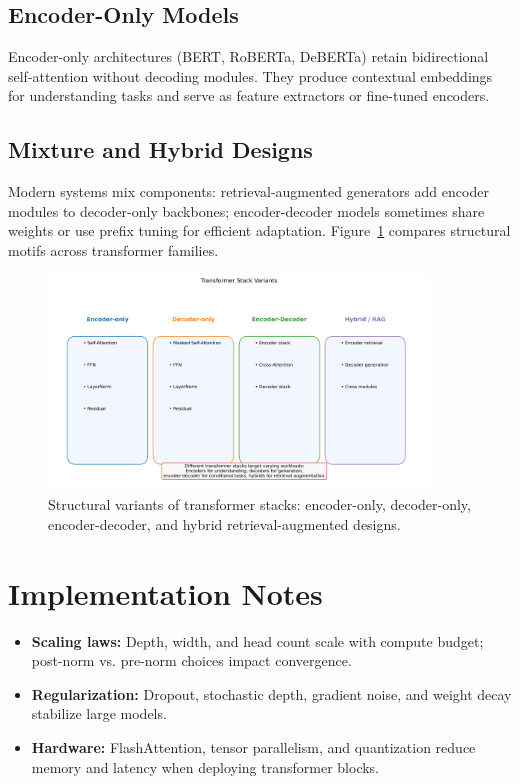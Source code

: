 \documentclass{article}
\begin{document}
\subsection{Encoder-Only Models}
Encoder-only architectures (BERT, RoBERTa, DeBERTa) retain bidirectional self-attention without decoding modules. They produce contextual embeddings for understanding tasks and serve as feature extractors or fine-tuned encoders.

\subsection{Mixture and Hybrid Designs}
Modern systems mix components: retrieval-augmented generators add encoder modules to decoder-only backbones; encoder-decoder models sometimes share weights or use prefix tuning for efficient adaptation. Figure~\ref{fig:transformer_stack_variants} compares structural motifs across transformer families.

\begin{figure}[H]
  \centering
  \includegraphics[width=0.9\textwidth]{transformer_stack_variants.png}
  \caption{Structural variants of transformer stacks: encoder-only, decoder-only, encoder-decoder, and hybrid retrieval-augmented designs.}
  \label{fig:transformer_stack_variants}
\end{figure}
\FloatBarrier

\section{Implementation Notes}
\begin{itemize}
  \item \textbf{Scaling laws:} Depth, width, and head count scale with compute budget; post-norm vs. pre-norm choices impact convergence.
  \item \textbf{Regularization:} Dropout, stochastic depth, gradient noise, and weight decay stabilize large models.
  \item \textbf{Hardware:} FlashAttention, tensor parallelism, and quantization reduce memory and latency when deploying transformer blocks.
\end{itemize}
\end{document}
